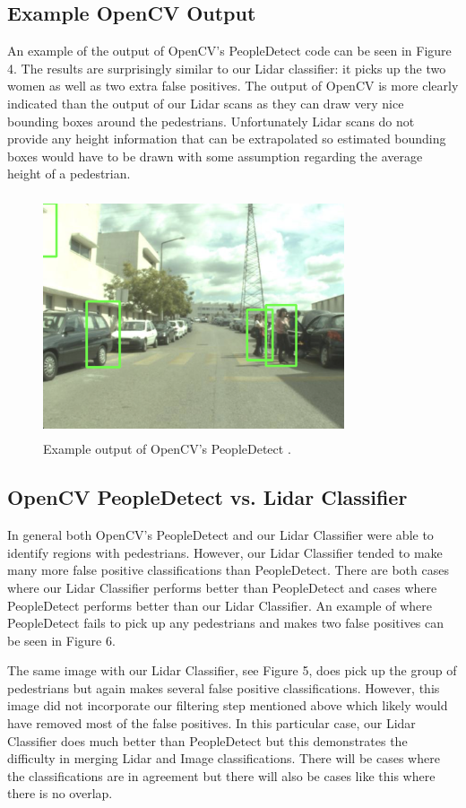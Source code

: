 \documentclass[10pt,twocolumn,letterpaper]{article}
\begin{document}
  \subsection{Example OpenCV Output}
  An example of the output of OpenCV's PeopleDetect \cite{opencv} code can be seen in Figure 4.
  The results are surprisingly similar to our Lidar classifier: it picks up the two
  women as well as two extra false positives. The output of OpenCV is more clearly
  indicated than the output of our Lidar scans as they can draw very nice bounding
  boxes around the pedestrians. Unfortunately Lidar scans do not provide any height
  information that can be extrapolated so estimated bounding boxes would have to be
  drawn with some assumption regarding the average height of a pedestrian.

  \begin{figure}
    \includegraphics[height=2.8in, width=3.5in]{images/peopledetect.png}
    \caption{ Example output of OpenCV's PeopleDetect \cite{opencv}. }
  \end{figure}


  \subsection{OpenCV PeopleDetect vs. Lidar Classifier}
  In general both OpenCV's PeopleDetect \cite{opencv} and our Lidar Classifier were
  able to identify regions with pedestrians. However, our Lidar Classifier tended to
  make many more false positive classifications than PeopleDetect. There are both
  cases where our Lidar Classifier performs better than PeopleDetect and cases where
  PeopleDetect performs better than our Lidar Classifier. An example of where PeopleDetect
  fails to pick up any pedestrians and makes two false positives can be seen in Figure 6.

  The same image with our Lidar Classifier, see Figure 5, does pick up the group of pedestrians but again
  makes several false positive classifications. However, this image did not incorporate our
  filtering step mentioned above which likely would have removed most of the false positives.
  In this particular case, our Lidar Classifier does much better than PeopleDetect but this
  demonstrates the difficulty in merging Lidar and Image classifications. There will be cases
  where the classifications are in agreement but there will also be cases like this where there
  is no overlap.
\end{document}
